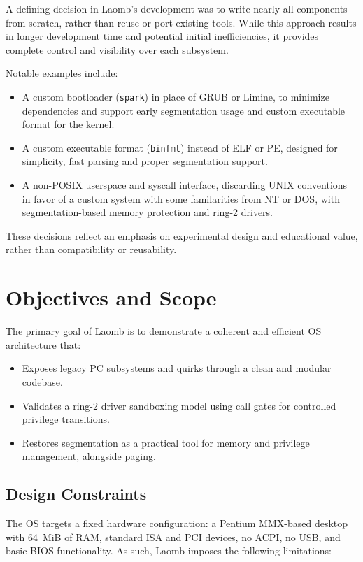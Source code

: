 \documentclass[12pt,a4paper]{report}
\begin{document}
	A defining decision in Laomb's development was to write nearly all components from scratch, rather than reuse or port existing tools. While this approach results in longer development time and potential initial inefficiencies, it provides complete control and visibility over each subsystem.

	Notable examples include:
	\begin{itemize}
		\item A custom bootloader (\texttt{spark}) in place of GRUB or Limine, to minimize dependencies and support early segmentation usage and custom executable format for the kernel.
		\item A custom executable format (\texttt{binfmt}) instead of ELF or PE, designed for simplicity, fast parsing and proper segmentation support.
		\item A non-POSIX userspace and syscall interface, discarding UNIX conventions in favor of a custom system with some familarities from NT or DOS, with segmentation-based memory protection and ring-2 drivers.
	\end{itemize}

	These decisions reflect an emphasis on experimental design and educational value, rather than compatibility or reusability.

	\section{Objectives and Scope}

	The primary goal of Laomb is to demonstrate a coherent and efficient OS architecture that:
	\begin{itemize}
		\item Exposes legacy PC subsystems and quirks through a clean and modular codebase.
		\item Validates a ring-2 driver sandboxing model using call gates for controlled privilege transitions.
		\item Restores segmentation as a practical tool for memory and privilege management, alongside paging.
	\end{itemize}

	\subsection{Design Constraints}

	The OS targets a fixed hardware configuration: a Pentium MMX-based desktop with 64~MiB of RAM, standard ISA and PCI devices, no ACPI, no USB, and basic BIOS functionality. As such, Laomb imposes the following limitations:
\end{document}
